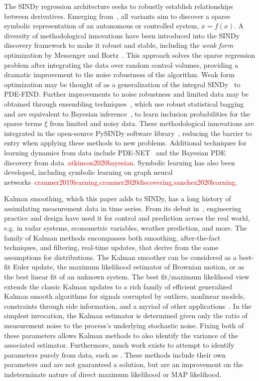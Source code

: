 \documentclass{article}
\newcommand{\red}[1]{\textcolor{red}{#1}}
\begin{document}
The SINDy regression architecture seeks to robustly establish relationships between derivatives.
Emerging from~\cite{Brunton2016,brunton2022data}, all variants aim to discover a sparse symbolic representation of an autonomous or controlled system, $\dot x = f(x)$.
A diversity of methodological innovations have been introduced into the SINDy discovery framework to make it robust and stable, including the \emph{weak form} optimization by Messenger and Bortz~\cite{messenger2021bweak,messenger2021weak}.
This approach solves the sparse regression problem after integrating the data over random control volumes, providing a dramatic improvement to the noise robustness of the algorithm.
Weak form optimization may be thought of as a generalization of the integral SINDy~\cite{Schaeffer2017} to PDE-FIND.
Further improvements to noise robustness and limited data may be obtained through ensembling techniques~\cite{Fasel2022}, which use robust statistical bagging and are equivalent to Bayesian inference~\cite{gao2022bayesian,gao2023convergence}, to learn inclusion probabilities for the sparse terms $\xi$ from limited and noisy data.
These methodological innovations are integrated in the open-source PySINDy software library~\cite{Kaptanoglu2022}, reducing the barrier to entry when applying these methods to new problems.  Additional techniques for learning dynamics from data include PDE-NET~\cite{Long2019,Long2018} and the Bayesian PDE discovery from data~\red{atkinson2020bayesian}.
Symbolic learning has also been developed, including symbolic learning on graph neural networks~\red{cranmer2019learning,cranmer2020discovering,sanchez2020learning}.

Kalman smoothing, which this paper adds to SINDy, has a long history of assimilating measurement data in time series.
From its debut in~\cite{kalman, KalBuc}, engineering practice and design have used it for control and prediction across the real world, e.g. in radar systems, econometric variables, weather prediction, and more.
The family of Kalman methods encompasses both smoothing, after-the-fact techniques, and filtering, real-time updates, that derive from the same assumptions for distributions.
The Kalman smoother can be considered as a best-fit Euler update, the maximum likelihood estimator of Brownian motion, or as the best linear fit of an unknown system.
The best fit/maximum likelihood view extends the classic Kalman updates to a rich family of efficient generalized Kalman smooth algorithms for signals corrupted by outliers, nonlinear models, constraints through side information, and a myriad of other applications~\cite{aravkin2017generalized}.
In the simplest invocation, the Kalman estimator is determined given only the ratio of measurement noise to the process's underlying stochastic noise.
Fixing both of these parameters allows Kalman methods to also identify the variance of the associated estimator.
Furthermore, much work exists to attempt to identify parameters purely from data, such as \cite{Barratt2020,VanBreugel2020}.
These methods include their own parameters and are not guaranteed a solution, but are an improvement on the indeterminate nature of direct maximum likelihood or MAP likelihood.
\end{document}

